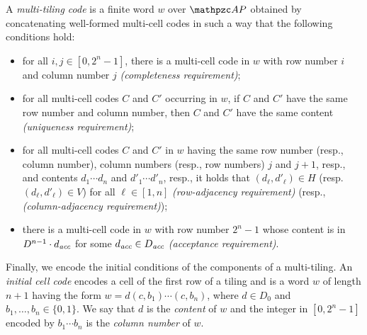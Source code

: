 \begin{definition}\label{Def:multiTilingCodes} 
A \emph{multi-tiling code} is a finite word $w$ over $\Prop$  obtained by concatenating well-formed multi-cell codes in such a way  that the following conditions hold:
\begin{itemize}
  \item for all $i,j\in [0,2^{n}-1]$, there is a multi-cell code in $w$  with row number $i$ and column number $j$ \emph{(completeness requirement)};
  \item for all multi-cell codes $C$ and $C'$ occurring in $w$, if $C$ and $C'$ have the same row number and column number, then $C$ and $C'$ have the same content \emph{(uniqueness requirement)};
   \item for all multi-cell codes $C$ and $C'$ in $w$ having the same row number
   (resp., column number), column numbers  (resp., row numbers) $j$ and $j+1$, resp., and contents $d_1\cdots d_n$ and $d'_1\cdots d'_n$, resp., it holds that $(d_\ell,d'_\ell)\in H$ (resp. $(d_\ell,d'_\ell)\in V$) for all $\ell\in [1,n]$ \emph{(row-adjacency requirement)} (resp., \emph{(column-adjacency requirement)});
  \item there is a multi-cell code in $w$ with row number $2^{n}-1$   whose content is in $D^{n-1}\cdot d_{\textit{acc}}$ for some $d_{\textit{acc}}\in D_{\textit{acc}}$ \emph{(acceptance requirement)}.
\end{itemize}
\end{definition}

Finally, we encode the initial conditions of the components of a multi-tiling.
An \emph{initial cell code} encodes a cell of the first row of a tiling
%
and is a word $w$ of length $n+1$ having the form $w =d (c,b_1) \cdots (c,b_n)$, where $d\in D_0$ and $b_1,\ldots,b_n\in \{0,1\}$. We say that $d$ is the \emph{content} of $w$ and the integer in $[0,2^{n}-1]$ encoded by $b_1\cdots b_n$ is the \emph{column number} of $w$. 


